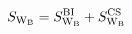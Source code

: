 \begin{equation}
\label{IIBwavesfull}
S_{\rm W_B} = S^{\rm BI}_{\rm W_B}+S^{\rm CS}_{\rm W_B}
\end{equation}

